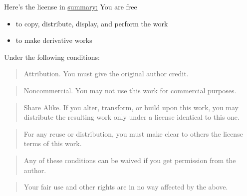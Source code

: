 \noindent Here's the license in
\href{http://creativecommons.org/licenses/by-nc-sa/1.0/}{summary:}
You are free

\begin{itemize}
\item
to copy, distribute, display, and perform the work
\item to make derivative works
\end{itemize}

\noindent Under the following conditions:

\begin{quote}
Attribution. You must give the original author credit.
\end{quote}
\begin{quote}
Noncommercial. You may not use this work for commercial purposes.
\end{quote}
\begin{quote}
Share Alike. If you alter, transform, or build upon this work, you
may distribute the resulting work only under a license identical to
this one.
\end{quote}
\begin{quote}
For any reuse or distribution, you must make clear to others the
license terms of this work.
\end{quote}
\begin{quote}
Any of these conditions can be waived if you get permission from
the author.
\end{quote}
\begin{quote}
Your fair use and other rights are in no way affected by the above.
\end{quote}

